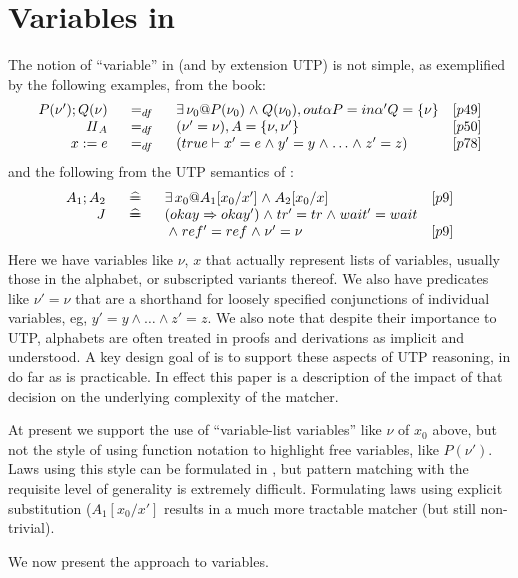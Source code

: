 \section{Variables in }\label{sec:variables}

The notion of ``variable'' in  (and by extension UTP)
is not simple, as exemplified by the following examples,
from the book\cite{UTP-book}:
\[\begin{array}{rcl@{\quad}r}
   P(\nu');Q(\nu) &~~=_{df}~~& \exists \nu_0 @ P(\nu_0)\land Q(\nu_0),
   out\alpha P = in\alpha' Q = \{\nu\}
   & [p49]
\\ \Skip_A &=_{df}& (\nu'=\nu), A = \{\nu,\nu'\}
   & [p50]
\\ x:=e &=_{df}& (true \design x'=e \land y'=y \land \ldots \land z'=z )
   &[p78]
\end{array}\]
and the following from the UTP semantics of \Circus\cite{journals/fac/OliveiraCW09}:
\[\begin{array}{rcl@{\quad}r}
   A_1 ; A_2 &~\defs~& \exists x_0 @ A_1[x_0/x'] \land A_2[x_0/x]
   & [p9]
\\ J &\defs& (okay\implies okay') \land tr'=tr \land wait'=wait
\\ && {} \land ref'=ref \land \nu'=\nu
   & [p9]
\end{array}\]
Here we have variables like $\nu$, $x$ that actually represent lists of variables,
usually those in the alphabet, or subscripted variants thereof.
We also have predicates like $\nu'=\nu$
that are a shorthand for loosely specified conjunctions of individual
variables, eg, $y'=y \land \ldots \land z'=z$.
We also note that despite their importance to UTP,
alphabets are often treated in proofs and derivations as implicit and understood.
A key design goal of  is to support these aspects of UTP reasoning,
in do far as is practicable.
In effect this paper is a description of the impact of that decision
on the underlying complexity of the matcher.

At present we support the use of ``variable-list variables'' like $\nu$ of $x_0$
above, but not the style of using function notation to highlight free
variables, like $P(\nu')$.
Laws using this style can be formulated in ,
but pattern matching with the requisite level of generality
is extremely difficult.
Formulating laws using explicit substitution ($A_1[x_0/x']$
results in a much more tractable matcher (but still non-trivial).

We now present the  approach to variables.

